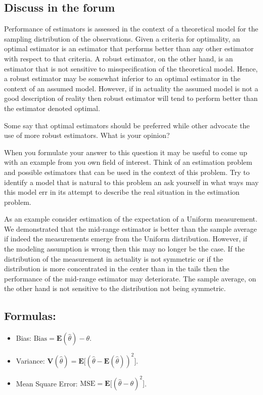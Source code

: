 \documentclass[]{krantz}
\newcommand{\Expec}{\mathbf{E}}
\newcommand{\Var}{\mathbf{V}}
\theoremstyle{definition}
\theoremstyle{definition}
\theoremstyle{definition}
\theoremstyle{remark}
\begin{document}
\hypertarget{discuss-in-the-forum}{%
\subsection*{Discuss in the forum}\label{discuss-in-the-forum}}


Performance of estimators is assessed in the context of a theoretical
model for the sampling distribution of the observations. Given a
criteria for optimality, an optimal estimator is an estimator that
performs better than any other estimator with respect to that criteria.
A robust estimator, on the other hand, is an estimator that is not
sensitive to misspecification of the theoretical model. Hence, a robust
estimator may be somewhat inferior to an optimal estimator in the
context of an assumed model. However, if in actuality the assumed model
is not a good description of reality then robust estimator will tend to
perform better than the estimator denoted optimal.

Some say that optimal estimators should be preferred while other
advocate the use of more robust estimators. What is your opinion?

When you formulate your answer to this question it may be useful to come
up with an example from you own field of interest. Think of an
estimation problem and possible estimators that can be used in the
context of this problem. Try to identify a model that is natural to this
problem an ask yourself in what ways may this model err in its attempt
to describe the real situation in the estimation problem.

As an example consider estimation of the expectation of a Uniform
measurement. We demonstrated that the mid-range estimator is better than
the sample average if indeed the measurements emerge from the Uniform
distribution. However, if the modeling assumption is wrong then this may
no longer be the case. If the distribution of the measurement in
actuality is not symmetric or if the distribution is more concentrated
in the center than in the tails then the performance of the mid-range
estimator may deteriorate. The sample average, on the other hand is not
sensitive to the distribution not being symmetric.

\hypertarget{formulas}{%
\subsection*{Formulas:}\label{formulas}}


\begin{itemize}
\item
  Bias: \(\mathrm{Bias} = \Expec(\hat \theta) - \theta\).
\item
  Variance:
  \(\Var(\hat \theta) = \Expec\big[(\hat \theta - \Expec(\hat\theta))^2\big]\).
\item
  Mean Square Error:
  \(\mathrm{MSE} = \Expec\big[(\hat \theta - \theta)^2\big]\).
\end{itemize}
\end{document}
